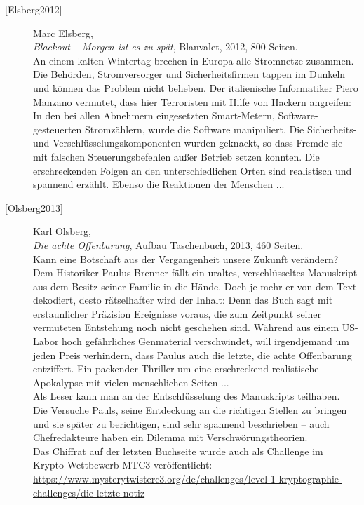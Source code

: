 \begin{description}
\item[\textrm{[Elsberg2012]}] 
    Marc Elsberg,\\
    {\em Blackout -- Morgen ist es zu spät}, Blanvalet, 2012, 800 Seiten.\\
    An einem kalten Wintertag brechen in Europa alle Stromnetze zusammen.
    Die Behörden, Stromversorger und Sicherheitsfirmen tappen im Dunkeln und können das
    Problem nicht beheben.
    Der italienische Informatiker Piero Manzano vermutet, dass hier Terroristen mit
    Hilfe von Hackern angreifen: In den bei
    allen Abnehmern eingesetzten Smart-Metern, Software-gesteuerten Stromzählern, wurde
    die Software manipuliert. Die Sicherheits- und Verschlüsselungskomponenten wurden
    geknackt, so dass Fremde sie mit falschen Steuerungsbefehlen außer Betrieb setzen
    konnten. Die erschreckenden Folgen an den unterschiedlichen Orten sind realistisch
    und spannend erzählt. Ebenso die Reaktionen der Menschen ...\\



\item[\textrm{[Olsberg2013]}] 
    Karl Olsberg,\\
    {\em Die achte Offenbarung}, Aufbau Taschenbuch, 2013, 460 Seiten.\\
    Kann eine Botschaft aus der Vergangenheit unsere Zukunft verändern?
    Dem Historiker Paulus Brenner fällt ein uraltes, verschlüsseltes Manuskript aus
    dem Besitz seiner Familie in die Hände. Doch je mehr er von dem Text dekodiert,
    desto rätselhafter wird der Inhalt: Denn das Buch sagt mit erstaunlicher Präzision
    Ereignisse voraus, die zum Zeitpunkt seiner vermuteten Entstehung noch nicht
    geschehen sind. Während aus einem US-Labor hoch gefährliches Genmaterial
    verschwindet, will irgendjemand um jeden Preis verhindern, dass Paulus auch die
    letzte, die achte Offenbarung entziffert. Ein packender Thriller um eine
    erschreckend realistische Apokalypse mit vielen menschlichen Seiten ...\\
    Als Leser kann man an der Entschlüsselung des Manuskripts teilhaben.\\
    Die Versuche Pauls, seine Entdeckung an die richtigen Stellen zu bringen und
    sie später zu berichtigen, sind sehr spannend beschrieben -- auch
    Chefredakteure haben ein Dilemma mit Verschwörungstheorien.\\
    Das Chiffrat auf der letzten Buchseite wurde auch als Challenge im Krypto-Wettbewerb MTC3
    veröffentlicht:~~
    \url{https://www.mysterytwisterc3.org/de/challenges/level-1-kryptographie-challenges/die-letzte-notiz}\\


\end{description}
